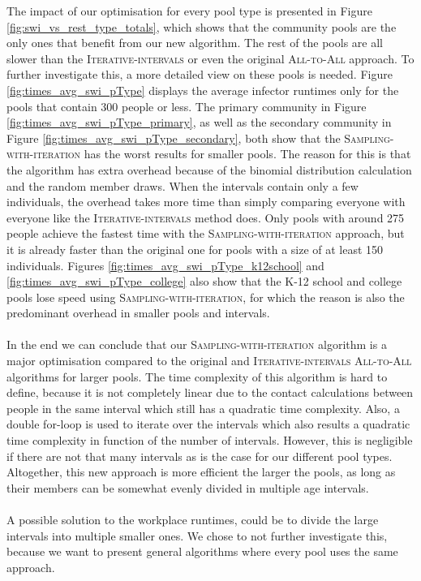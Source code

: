 The impact of our optimisation for every pool type is presented in Figure \ref{fig:swi_vs_rest_type_totals}, which shows that the community pools are the only ones that benefit from our new algorithm. The rest of the pools are all slower than the \textsc{Iterative-intervals} or even the original \textsc{All-to-All} approach. To further investigate this, a more detailed view on these pools is needed. Figure \ref{fig:times_avg_swi_pType} displays the average infector runtimes only for the pools that contain 300 people or less. The primary community in Figure \ref{fig:times_avg_swi_pType_primary}, as well as the secondary community in Figure \ref{fig:times_avg_swi_pType_secondary}, both show that the \textsc{Sampling-with-iteration} has the worst results for smaller pools. The reason for this is that the algorithm has extra overhead because of the binomial distribution calculation and the random member draws. When the intervals contain only a few individuals, the overhead takes more time than simply comparing everyone with everyone like the \textsc{Iterative-intervals} method does. Only pools with around 275 people achieve the fastest time with the \textsc{Sampling-with-iteration} approach, but it is already faster than the original one for pools with a size of at least 150 individuals. Figures \ref{fig:times_avg_swi_pType_k12school} and \ref{fig:times_avg_swi_pType_college} also show that the K-12 school and college pools lose speed using \textsc{Sampling-with-iteration}, for which the reason is also the predominant overhead in smaller pools and intervals.
\\\\
In the end we can conclude that our \textsc{Sampling-with-iteration} algorithm is a major optimisation compared to the original and \textsc{Iterative-intervals} \textsc{All-to-All} algorithms for larger pools. The time complexity of this algorithm is hard to define, because it is not completely linear due to the contact calculations between people in the same interval which still has a quadratic time complexity. Also, a double for-loop is used to iterate over the intervals which also results a quadratic time complexity in function of the number of intervals. However, this is negligible if there are not that many intervals as is the case for our different pool types. Altogether, this new approach is more efficient the larger the pools, as long as their members can be somewhat evenly divided in multiple age intervals.
\\\\
A possible solution to the workplace runtimes, could be to divide the large intervals into multiple smaller ones. We chose to not further investigate this, because we want to present general algorithms where every pool uses the same approach.

